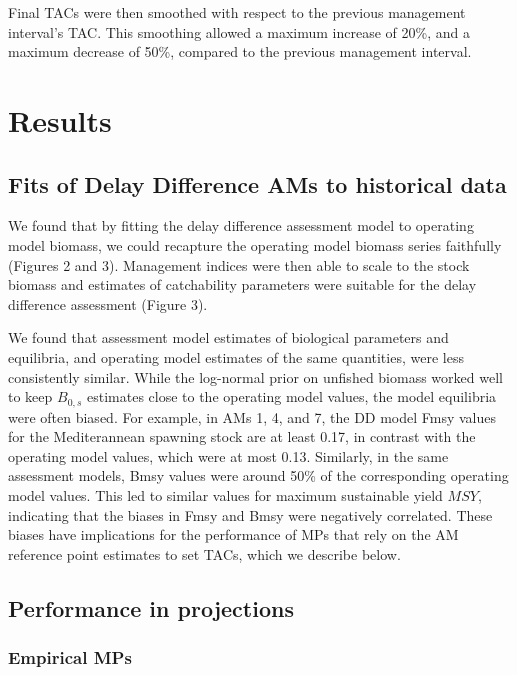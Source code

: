\documentclass[]{article}
\begin{document}
Final TACs were then smoothed with respect to the previous management
interval's TAC. This smoothing allowed a maximum increase of 20\%, and
a maximum decrease of 50\%, compared to the previous management interval.

\hypertarget{results}{%
\section{Results}\label{results}}

\hypertarget{fits-of-delay-difference-ams-to-historical-data}{%
\subsection{Fits of Delay Difference AMs to historical data}\label{fits-of-delay-difference-ams-to-historical-data}}

We found that by fitting the delay difference assessment model to operating
model biomass, we could recapture the operating model biomass series
faithfully (Figures 2 and 3). Management indices were then able to scale
to the stock biomass and estimates of catchability parameters were suitable
for the delay difference assessment (Figure 3).

We found that assessment model estimates of biological parameters
and equilibria, and operating model estimates of the same quantities, were
less consistently similar. While the log-normal prior on unfished biomass
worked well to keep \(B_{0,s}\) estimates close to the operating model values,
the model equilibria were often biased. For example, in AMs 1, 4, and 7, the
DD model Fmsy values for the Mediterannean spawning stock are at least 0.17,
in contrast with the operating model values, which were at most 0.13. Similarly,
in the same assessment models, Bmsy values were around 50\% of the corresponding
operating model values. This led to similar values for maximum sustainable
yield \(MSY\), indicating that the biases in Fmsy and Bmsy were negatively correlated.
These biases have implications for the performance of MPs that rely on the
AM reference point estimates to set TACs, which we describe below.

\hypertarget{performance-in-projections}{%
\subsection{Performance in projections}\label{performance-in-projections}}

\hypertarget{empirical-mps}{%
\subsubsection{Empirical MPs}\label{empirical-mps}}
\end{document}

